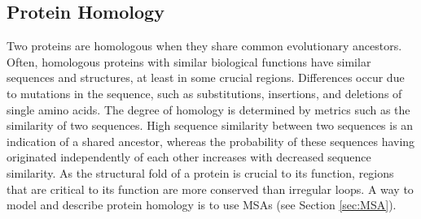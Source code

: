 \subsection{Protein Homology}

Two proteins are homologous when they share common evolutionary ancestors. 
Often, homologous proteins with similar biological functions have similar sequences and structures, at least in some crucial regions. Differences occur due to mutations in the sequence, such as substitutions, insertions, and deletions of single amino acids. 
The degree of homology is determined by metrics such as the similarity of two sequences. 
High sequence similarity between two sequences is an indication of a shared ancestor, whereas the probability of these sequences having originated independently of each other increases with decreased sequence similarity. As the structural fold of a protein is crucial to its function, regions that are critical to its function are more conserved than irregular loops.
A way to model and describe  protein homology is to use \acp{MSA} (see Section \ref{sec:MSA}). 


